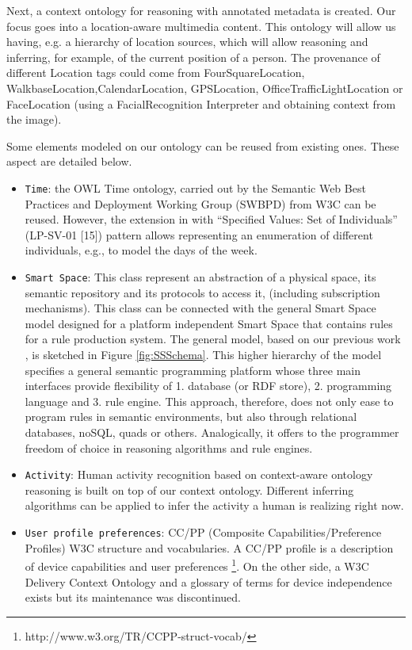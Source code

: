 \documentclass[[10pt,abbrv]{llncs}
\begin{document}
Next, a context ontology for reasoning with annotated metadata is created. Our focus goes into a location-aware multimedia content. This ontology will allow us having, e.g. a hierarchy of location sources, which will allow reasoning and inferring, for example, of the current position of a person. The provenance of different Location tags could come from FourSquareLocation, WalkbaseLocation,CalendarLocation, GPSLocation, OfficeTrafficLightLocation or FaceLocation (using a FacialRecognition Interpreter and obtaining context from the image).



Some elements modeled on our ontology can be reused from existing ones. These aspect are detailed below.
\begin{itemize}
\item \verb+Time+: the OWL Time ontology, carried out by the Semantic Web Best Practices and Deployment Working Group (SWBPD) from W3C can be reused. However, the extension in \cite{Poveda10} with “Specified Values: Set of Individuals” (LP-SV-01 [15]) pattern allows representing an enumeration of different individuals, e.g., to model the days of the week.
\item \verb+Smart Space+: This class represent an abstraction of a physical space, its semantic repository and its protocols to access it, (including subscription mechanisms). This class can be connected with the general Smart Space model designed for a platform independent Smart Space that contains rules for a rule production system. The general model, based on our previous work \cite{ruSmart}, is sketched in Figure \ref{fig:SSSchema}. This higher hierarchy of the model specifies a general semantic programming platform whose three main interfaces provide flexibility of 1. database (or RDF store), 2. programming language and 3. rule engine. This approach, therefore, does not only ease to program rules in semantic environments, but also through relational databases, noSQL, quads or others. Analogically, it offers to the programmer freedom of choice in reasoning algorithms and rule engines.
\item \verb+Activity+: Human activity recognition based on context-aware ontology reasoning is built on top of our context ontology. Different inferring algorithms can be applied to infer the activity a human is realizing right now.
\item  \verb+User profile preferences+: CC/PP (Composite Capabilities/Preference Profiles) W3C structure and vocabularies. A CC/PP profile is a description of device capabilities and user preferences \footnote{http://www.w3.org/TR/CCPP-struct-vocab/}. On the other side, a W3C Delivery Context Ontology and a glossary of terms for device independence exists but its maintenance was discontinued.

\end{itemize}
\end{document}
